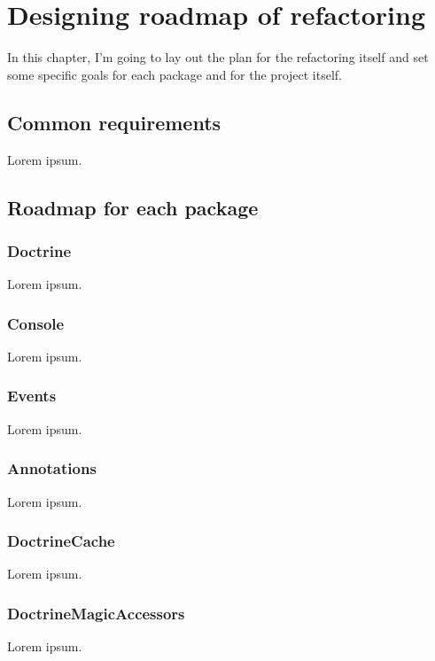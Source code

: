 \chapter{Designing roadmap of refactoring}

In this chapter, I'm going to lay out the plan for the refactoring itself and set some specific goals for each package and for the project itself.

\section{Common requirements}

Lorem ipsum.

\section{Roadmap for each package}

\subsection{Doctrine}

Lorem ipsum.

\subsection{Console}

Lorem ipsum.

\subsection{Events}

Lorem ipsum.

\subsection{Annotations}

Lorem ipsum.

\subsection{DoctrineCache}

Lorem ipsum.

\subsection{DoctrineMagicAccessors}

Lorem ipsum.

